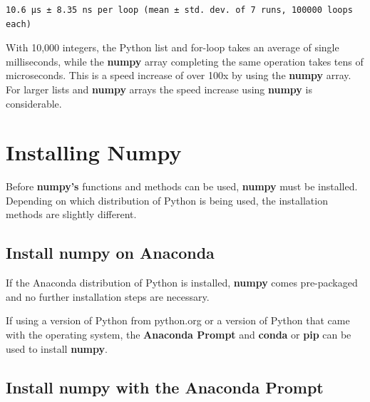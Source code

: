 \documentclass{book}
\begin{document}
    \begin{Verbatim}[commandchars=\\\{\}]
10.6 µs ± 8.35 ns per loop (mean ± std. dev. of 7 runs, 100000 loops each)

    \end{Verbatim}


    
        With 10,000 integers, the Python list and for-loop takes an average of
single milliseconds, while the \textbf{numpy} array completing the same
operation takes tens of microseconds. This is a speed increase of over
100x by using the \textbf{numpy} array. For larger lists and
\textbf{numpy} arrays the speed increase using \textbf{numpy} is
considerable.
    




    
        \section{Installing Numpy}\label{installing-numpy}
    




    
        Before \textbf{numpy's} functions and methods can be used,
\textbf{numpy} must be installed. Depending on which distribution of
Python is being used, the installation methods are slightly different.
    




    
        \subsection{Install numpy on Anaconda}\label{install-numpy-on-anaconda}

If the Anaconda distribution of Python is installed, \textbf{numpy}
comes pre-packaged and no further installation steps are necessary.

If using a version of Python from python.org or a version of Python that
came with the operating system, the \textbf{Anaconda Prompt} and
\textbf{conda} or \textbf{pip} can be used to install \textbf{numpy}.
    




    
        \subsection{Install numpy with the Anaconda
Prompt}\label{install-numpy-with-the-anaconda-prompt}
\end{document}
